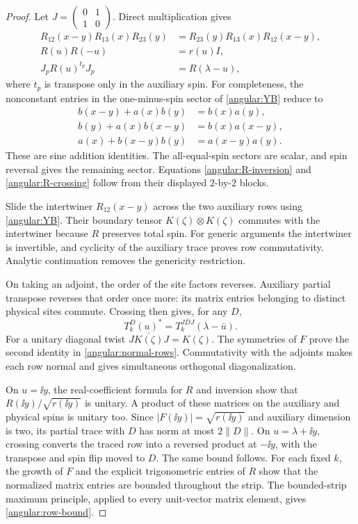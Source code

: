 \begin{proof}
Let $J=\left(\begin{smallmatrix}0&1\\1&0\end{smallmatrix}\right)$.
Direct multiplication gives
\begin{align}
 R_{12}(x-y)R_{13}(x)R_{23}(y)
 &=R_{23}(y)R_{13}(x)R_{12}(x-y),\label{angular:YB}\\
 R(u)R(-u)&=r(u)I,\label{angular:R-inversion}\\
 J_pR(u)^{t_p}J_p&=R(\lambda-u),\label{angular:R-crossing}
\end{align}
where $t_p$ is transpose only in the auxiliary spin.  For completeness,
the nonconstant entries in the one-minus-spin sector of
\eqref{angular:YB} reduce to
\begin{align*}
 b(x-y)+a(x)b(y)&=b(x)a(y),\\
 b(y)+a(x)b(x-y)&=b(x)a(x-y),\\
 a(x)+b(x-y)b(y)&=a(x-y)a(y).
\end{align*}
These are sine addition identities.  The all-equal-spin sectors are
scalar, and spin reversal gives the remaining sector.  Equations
\eqref{angular:R-inversion} and \eqref{angular:R-crossing} follow
from their displayed $2$-by-$2$ blocks.

Slide the intertwiner $R_{12}(x-y)$ across the two auxiliary rows
using \eqref{angular:YB}.  Their boundary tensor
$K(\zeta)\otimes K(\zeta)$ commutes with the intertwiner because
$R$ preserves total spin.  For generic arguments the intertwiner is
invertible, and cyclicity of the auxiliary trace proves row
commutativity.  Analytic continuation removes the genericity
restriction.

On taking an adjoint, the order of the site factors reverses.
Auxiliary partial transpose reverses that order once more: its matrix
entries belonging to distinct physical sites commute.  Crossing then
gives, for any $D$,
\[
 T_k^D(u)^*=T_k^{J\bar D J}(\lambda-\bar u).
\]
For a unitary diagonal twist $J\overline{K(\zeta)}J=K(\zeta)$.
The symmetries of $F$ prove the second identity in
\eqref{angular:normal-rows}.  Commutativity with the adjoints makes
each row normal and gives simultaneous orthogonal diagonalization.

On $u=\ii y$, the real-coefficient formula for $R$ and inversion
show that $R(\ii y)/\sqrt{r(\ii y)}$ is unitary.  A product of
these matrices on the auxiliary and physical spins is unitary too.
Since $|F(\ii y)|=\sqrt{r(\ii y)}$ and auxiliary dimension is two,
its partial trace with $D$ has norm at most $2\|D\|$.  On
$u=\lambda+\ii y$, crossing converts the traced row into a reversed
product at $-\ii y$, with the transpose and spin flip moved to $D$.
The same bound follows.  For each fixed $k$, the growth of $F$ and
the explicit trigonometric entries of $R$ show that the normalized
matrix entries are bounded throughout the strip.  The bounded-strip
maximum principle, applied to every unit-vector matrix element,
gives \eqref{angular:row-bound}.
\end{proof}

